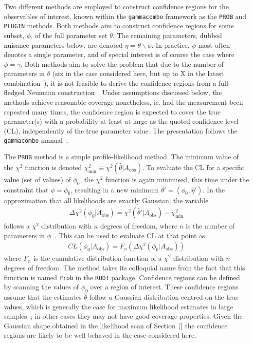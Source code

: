 Two different methods are employed to construct confidence regions for the observables of interest, known within the \texttt{gammacombo} framework as the \texttt{PROB} and \texttt{PLUGIN} methods. Both methods aim to construct confidence regions for some subset, $\phi$, of the full parameter set $\theta$. The remaining parameters, dubbed nuisance parameters below, are denoted $\eta = \theta \backslash \phi$. In practice, $\phi$ most often denotes a single parameter, and of special interest is of course the case where $\phi = \gamma$. Both methods aim to solve the problem that due to the number of parameters in $\theta$ (six in the case considered here, but up to X in the latest \lhcb combination~\cite{}), it is not feasible to derive the confidence regions from a full-fledged Neumann construction~\cite{}. Under assumptions discussed below, the methods achieve reasonable coverage nonetheless, ie. had the measurement been repeated many times, the confidence region is expected to cover the true parameter(s) with a probability at least at large as the quoted confidence level (CL), independently of the true parameter value. The presentation follows the \texttt{gammacombo} manual~\cite{}. 

The \texttt{PROB} method is a simple profile-likelihood method. The minimum value of the $\chi^2$ function is denoted $\chi^2_\mathrm{min}\equiv\chi^2(\hat \theta|A_\mathrm{obs})$.  To evaluate the CL for a specific value (set of values) of $\phi_0$, the $\chi^2$ function is again minimised, this time under the constraint that $\phi=\phi_0$, resulting in a new minimum $\hat \theta' = (\phi_0, \hat \eta')$. In the approximation that all likelihoods are exactly Gaussian, the variable
\begin{align}
    \Delta \chi^2(\phi_0|A_\mathrm{obs}) = \chi^2(\hat \theta '|A_\mathrm{obs}) - \chi^2_\mathrm{min}
\end{align}
follows a $\chi^2$ distribution with $n$ degrees of freedom, where $n$ is the number of parameters in $\phi$~\cite{PDG2020}. This can be used to evaluate CL at that point as
\begin{align}
    CL(\phi_0|A_\mathrm{obs}) = F_n(\Delta \chi^2(\phi_0|A_\mathrm{obs}))
\end{align}
where $F_n$ is the cumulative distribution function of a $\chi^2$ distribution with $n$ degrees of freedom. The method takes its colloquial name from the fact that this function is named \texttt{Prob} in the \texttt{ROOT} package. Confidence regions can be defined by scanning the values of $\phi_0$ over a region of interest. These confidence regions assume that the estimates $\hat \theta$ follow a Gaussian distribution centred on the true values, which is generally the case for maximum likelihood estimates in large samples~\cite{}; in other cases they may not have good coverage properties. Given the Gaussian shape obtained in the likelihood scan of Section~\ref{} the confidence regions are likely to be well behaved in the case considered here.


